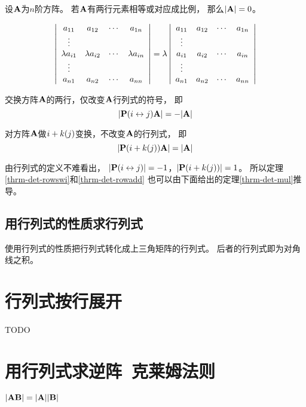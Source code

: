 \begin{theorem}
  设$\mmA$为$n$阶方阵。
  若$\mmA$有两行元素相等或对应成比例，
  那么$|\mmA| = 0$。
\end{theorem}

\begin{theorem}
  \begin{displaymath}
    \mdet{cccc}{
      a_{11} & a_{12} & \cdots & a_{1n} \\
      \vdots &        &        &        \\
      \lambda a_{i1} & \lambda a_{i2} & \cdots & \lambda a_{in} \\
      \vdots &        &        &        \\
      a_{n1} & a_{n2} & \cdots & a_{nn} }
    = \lambda \mdet{cccc}{
      a_{11} & a_{12} & \cdots & a_{1n} \\
      \vdots &        &        &        \\
      a_{i1} & a_{i2} & \cdots & a_{in} \\
      \vdots &        &        &        \\
      a_{n1} & a_{n2} & \cdots & a_{nn} }
  \end{displaymath}
\end{theorem}

\begin{theorem} \label{thrm-det-rowswi}
  交换方阵$\mmA$的两行，仅改变$\mmA$行列式的符号，
  即\[ |\mmRowSwi{i}{j}\mmA| = -|\mmA| \]
\end{theorem}

\begin{theorem} \label{thrm-det-rowadd}
  对方阵$\mmA$做$\mTfRowAdd{i}{+k}{j}$变换，不改变$\mmA$的行列式，
  即\[ |\mmRowAdd{i}{+k}{j}\mmA| = |\mmA| \]
\end{theorem}

\begin{remark}
  由行列式的定义不难看出，
  $|\mmRowSwi{i}{j}|=-1$，$|\mmRowAdd{i}{+k}{j}|=1$。
  所以定理\ref{thrm-det-rowswi}和\ref{thrm-det-rowadd}
  也可以由下面给出的定理\ref{thrm-det-mul}推导。
\end{remark}

\subsection{用行列式的性质求行列式}
使用行列式的性质把行列式转化成上三角矩阵的行列式。
后者的行列式即为对角线之积。

\section{行列式按行展开}
TODO

\section{用行列式求逆阵\ 克莱姆法则}
\begin{theorem} \label{thrm-det-mul}
  $|\mmA\mmB|=|\mmA||\mmB|$
\end{theorem}